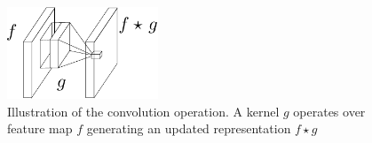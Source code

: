 \begin{figure}[H]
    \centering
    \includegraphics[width=0.4\textwidth]{fig/rel/images/conv_schema.pdf}
    \caption{Illustration of the convolution operation. A kernel $g$ operates over feature map $f$ 
             generating an updated representation $f\star g$ \autocite{lin2013network}}
    \label{fig:conv_local}
\end{figure}